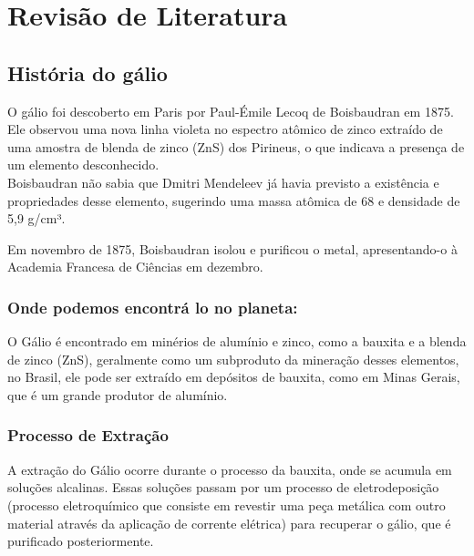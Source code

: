 \documentclass{article}
\begin{document}
\section{Revisão de Literatura}
\subsection{História do gálio}
O gálio foi descoberto em Paris por Paul-Émile Lecoq de Boisbaudran em 1875. 
\\
Ele observou uma nova linha violeta no espectro atômico de zinco extraído de uma amostra de blenda de zinco (ZnS) dos Pirineus, o que indicava a presença de um elemento desconhecido.
\\
Boisbaudran não sabia que Dmitri Mendeleev já havia previsto a existência e propriedades desse elemento, sugerindo uma massa atômica de 68 e densidade de 5,9 g/cm³. 

Em novembro de 1875, Boisbaudran isolou e purificou o metal, apresentando-o à Academia Francesa de Ciências em dezembro.
\subsubsection{Onde podemos encontrá lo no planeta:}
O Gálio é encontrado em minérios de alumínio e zinco, como a bauxita e a blenda de zinco (ZnS), geralmente como um subproduto da mineração desses elementos, no Brasil, ele pode ser extraído em depósitos de bauxita, como em Minas Gerais, que é um grande produtor de alumínio.
\subsubsection{Processo de Extração}
A extração do Gálio ocorre durante o processo da bauxita, onde se acumula em soluções alcalinas. Essas soluções passam por um processo de eletrodeposição (processo eletroquímico que consiste em revestir uma peça metálica com outro material através da aplicação de corrente elétrica) para recuperar o gálio, que é purificado posteriormente. 
\end{document}
